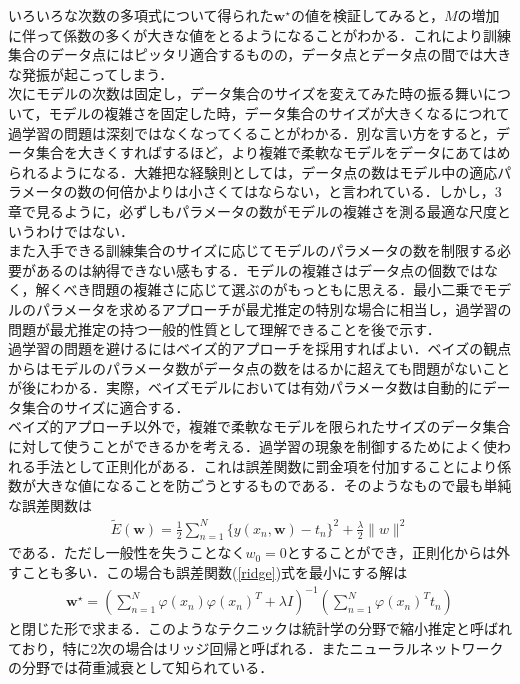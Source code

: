 \documentclass{jsarticle}
\theoremstyle{definition}
\begin{document}
いろいろな次数の多項式について得られた$\bm w^{\star}$の値を検証してみると，$M$の増加に伴って係数の多くが大きな値をとるようになることがわかる．これにより訓練集合のデータ点にはピッタリ適合するものの，データ点とデータ点の間では大きな発振が起こってしまう．\\

次にモデルの次数は固定し，データ集合のサイズを変えてみた時の振る舞いについて，モデルの複雑さを固定した時，データ集合のサイズが大きくなるにつれて過学習の問題は深刻ではなくなってくることがわかる．別な言い方をすると，データ集合を大きくすればするほど，より複雑で柔軟なモデルをデータにあてはめられるようになる．大雑把な経験則としては，データ点の数はモデル中の適応パラメータの数の何倍かよりは小さくてはならない，と言われている．しかし，3章で見るように，必ずしもパラメータの数がモデルの複雑さを測る最適な尺度というわけではない．\\

また入手できる訓練集合のサイズに応じてモデルのパラメータの数を制限する必要があるのは納得できない感もする．モデルの複雑さはデータ点の個数ではなく，解くべき問題の複雑さに応じて選ぶのがもっともに思える．最小二乗でモデルのパラメータを求めるアプローチが最尤推定の特別な場合に相当し，過学習の問題が最尤推定の持つ一般的性質として理解できることを後で示す．\\

過学習の問題を避けるにはベイズ的アプローチを採用すればよい．ベイズの観点からはモデルのパラメータ数がデータ点の数をはるかに超えても問題がないことが後にわかる．実際，ベイズモデルにおいては有効パラメータ数は自動的にデータ集合のサイズに適合する．\\

ベイズ的アプローチ以外で，複雑で柔軟なモデルを限られたサイズのデータ集合に対して使うことができるかを考える．過学習の現象を制御するためによく使われる手法として正則化がある．これは誤差関数に罰金項を付加することにより係数が大きな値になることを防ごうとするものである．そのようなもので最も単純な誤差関数は
\begin{align}
  \label{ridge}
\tilde E(\bm w) = \frac{1}{2}\sum_{n=1}^N\{y(x_n,\bm w)- t_n\}^2+\frac{\lambda}{2}\|w\|^2
\end{align}
である．ただし一般性を失うことなく$w_0 = 0$とすることができ，正則化からは外すことも多い．この場合も誤差関数(\ref*{ridge})式を最小にする解は
\begin{align*}
  \bm w^{\star} = \left( \sum_{n=1}^N\varphi(x_n)\varphi(x_n)^T + \lambda I\right)^{-1}\left( \sum_{n=1}^N\varphi(x_n)^T t_n \right)
  \end{align*}
と閉じた形で求まる．このようなテクニックは統計学の分野で縮小推定と呼ばれており，特に2次の場合はリッジ回帰と呼ばれる．またニューラルネットワークの分野では荷重減衰として知られている．\\
\end{document}
